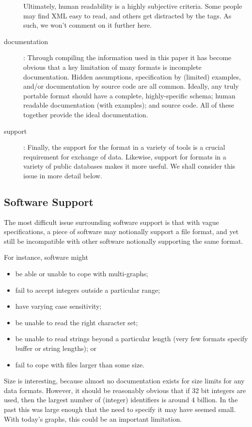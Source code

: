 \documentclass{sig-alternate}
\begin{document}
\begin{description}
  Ultimately, human readability is a highly subjective criteria. Some
  people may find XML easy to read, and others get distracted by the
  tags. As such, we won't comment on it further here.

\item[documentation]: Through compiling the information used in this
  paper it has become obvious that a key limitation of many formats is
  incomplete documentation. Hidden assumptions, specification by
  (limited) examples, and/or documentation by source code are all
  common. Ideally, any truly portable format should have a complete,
  highly-specific schema; human readable documentation (with
  examples); and source code. All of these together provide the
  ideal documentation.

\item[support]: Finally, the support for the format in a variety of
  tools is a crucial requirement for exchange of data. Likewise,
  support for formats in a variety of public databases makes it more
  useful. We shall consider this issue in more detail below.   

\end{description}

\subsection{Software Support} 

The most difficult issue surrounding software support is that with
vague specifications, a piece of software may notionally support a
file format, and yet still be incompatible with other software
notionally supporting the same format.

For instance, software might
\begin{itemize}
\item be able or unable to cope with multi-graphs;
\item fail to accept integers outside a particular range;
\item have varying case sensitivity; 
\item be unable to read the right character set;
\item be unable to read strings beyond a particular length (very few
  formats specify buffer or string lengths); or
\item fail to cope with files larger than some size. 
\end{itemize}
Size is interesting, because almost no documentation exists for size
limits for any data formats. However, it should be reasonably obvious
that if 32 bit integers are used, then the largest number of (integer)
identifiers is around 4 billion. In the past this was large enough
that the need to specify it may have seemed small. With today's
graphs, this could be an important limitation.
\end{document}
